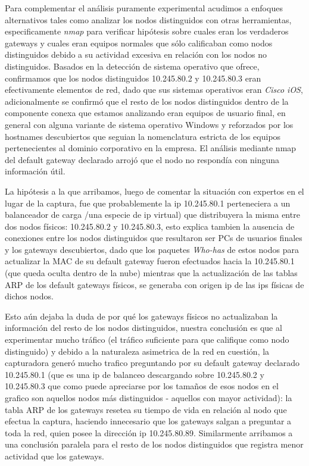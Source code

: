 Para complementar el análisis puramente experimental acudimos a enfoques alternativos tales como analizar los nodos distinguidos con otras herramientas, especificamente \textit{nmap} para verificar hipótesis sobre cuales eran los verdaderos gateways y cuales eran equipos normales que sólo calificaban como nodos distinguidos debido a su actividad excesiva en relación con los nodos no distinguidos. Basados en la detección de sistema operativo que ofrece, confirmamos que los nodos distinguidos 10.245.80.2 y 10.245.80.3 eran efectivamente elementos de red, dado que sus sistemas operativos eran \textit{Cisco iOS}, adicionalmente se confirmó que el resto de los nodos distinguidos dentro de la componente conexa que estamos analizando eran equipos de usuario final, en general con alguna variante de sistema operativo Windows y reforzados por los hostnames descubiertos que seguian la nomenclatura estricta de los equipos pertenecientes al dominio corporativo en la empresa. El análisis mediante nmap del default gateway declarado arrojó que el nodo no respondía con ninguna información útil.

La hipótesis a la que arribamos, luego de comentar la situación con expertos en el lugar de la captura, fue que probablemente la ip 10.245.80.1 perteneciera a un balanceador de carga /una especie de ip virtual) que distribuyera la misma entre dos nodos físicos: 10.245.80.2 y 10.245.80.3, esto explica tambien la ausencia de conexiones entre los nodos distinguidos que resultaron ser PCs de usuarios finales y los gateways descubiertos, dado que los paquetes \textit{Who-has} de estos nodos para actualizar la MAC de su default gateway fueron efectuados hacia la 10.245.80.1 (que queda oculta dentro de la nube) mientras que la actualización de las tablas ARP de los default gateways físicos, se generaba con origen ip de las ips físicas de dichos nodos.

Esto aún dejaba la duda de por qué los gateways físicos no actualizaban la información del resto de los nodos distinguidos, nuestra conclusión es que al experimentar mucho tráfico (el tráfico suficiente para que califique como nodo distinguido) y debido a la naturaleza asimetrica de la red en cuestión, la capturadora generó mucho trafico preguntando por su default gateway declarado 10.245.80.1 (que es una ip de balanceo descargando sobre 10.245.80.2 y 10.245.80.3  que como puede apreciarse por los tamaños de esos nodos en el grafico son aquellos nodos más distinguidos - aquellos con mayor actividad): la tabla ARP de los gateways resetea su tiempo de vida en relación al nodo que efectua la captura, haciendo innecesario que los gateways salgan a preguntar a toda la red, quien posee la dirección ip 10.245.80.89.
Similarmente arribamos a una conclusión paralela para el resto de los nodos distinguidos que registra menor actividad que los gateways.\\

